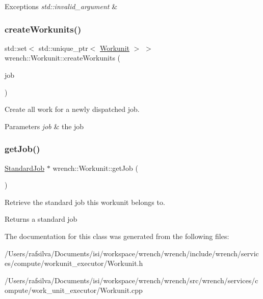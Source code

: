 \begin{DoxyExceptions}{Exceptions}
{\em std\+::invalid\+\_\+argument} & \\
\hline
\end{DoxyExceptions}
\mbox{\label{classwrench_1_1_workunit_ad48a60254d823c530273f793611bdfc2}} 
\subsubsection{\texorpdfstring{create\+Workunits()}{createWorkunits()}}
{\footnotesize\ttfamily std\+::set$<$ std\+::unique\+\_\+ptr$<$ \hyperlink{classwrench_1_1_workunit}{Workunit} $>$ $>$ wrench\+::\+Workunit\+::create\+Workunits (\begin{DoxyParamCaption}\item[{\hyperlink{classwrench_1_1_standard_job}{Standard\+Job} $\ast$}]{job }\end{DoxyParamCaption})\hspace{0.3cm}{\ttfamily [static]}}



Create all work for a newly dispatched job. 


\begin{DoxyParams}{Parameters}
{\em job} & the job \\
\hline
\end{DoxyParams}
\mbox{\label{classwrench_1_1_workunit_a84e73108e9516bf7abfb6c136ef8bbc1}} 
\subsubsection{\texorpdfstring{get\+Job()}{getJob()}}
{\footnotesize\ttfamily \hyperlink{classwrench_1_1_standard_job}{Standard\+Job} $\ast$ wrench\+::\+Workunit\+::get\+Job (\begin{DoxyParamCaption}{ }\end{DoxyParamCaption})}



Retrieve the standard job this workunit belongs to. 

\begin{DoxyReturn}{Returns}
a standard job 
\end{DoxyReturn}


The documentation for this class was generated from the following files\+:\begin{DoxyCompactItemize}
\item 
/\+Users/rafsilva/\+Documents/isi/workspace/wrench/wrench/include/wrench/services/compute/workunit\+\_\+executor/Workunit.\+h\item 
/\+Users/rafsilva/\+Documents/isi/workspace/wrench/wrench/src/wrench/services/compute/work\+\_\+unit\+\_\+executor/Workunit.\+cpp\end{DoxyCompactItemize}
